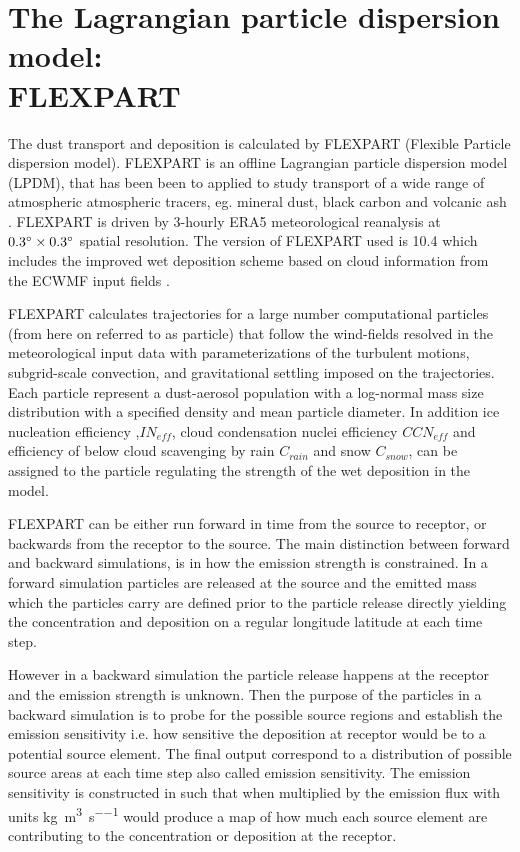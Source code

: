 \section{The Lagrangian particle dispersion model: \protect\\ FLEXPART}

\par The dust transport and deposition is calculated by FLEXPART (Flexible Particle dispersion model). FLEXPART is an offline Lagrangian particle dispersion model (LPDM), that has been been to applied to study transport of a wide range of atmospheric atmospheric tracers, eg. mineral dust, black carbon and volcanic ash \parencite{flexdust_ref_2016,choi_investigation_2020, eckhardt2008estimation}. FLEXPART is driven by 3-hourly ERA5 meteorological reanalysis at $0.3\degree \times 0.3\degree$ spatial resolution. The version of FLEXPART used is 10.4 which includes the improved wet deposition scheme based on cloud information from the ECWMF input fields \parencite{flexpart_wetdep}. 
\par FLEXPART calculates trajectories for a large number computational particles (from here on referred to as particle) that follow the wind-fields resolved in the meteorological input data with parameterizations of the turbulent motions, subgrid-scale convection, and gravitational settling imposed on the trajectories. Each particle represent a dust-aerosol population with a log-normal mass size distribution with a specified density and mean particle diameter. In addition ice nucleation efficiency ,$IN_{eff}$, cloud condensation nuclei efficiency $CCN_{eff}$ and efficiency of below cloud scavenging by rain $C_{rain}$ and snow $C_{snow}$, can be assigned to the particle regulating the strength of the wet deposition in the model.   

FLEXPART can be either run forward in time from the source to receptor, or backwards from the receptor to the source. The main distinction between forward and backward simulations, is in how the emission strength is constrained. In a forward simulation particles are released at the source and the emitted mass which the particles carry are defined prior to the particle release directly yielding the concentration and deposition on a regular longitude latitude at each time step. 

However in a backward simulation the particle release happens at the receptor and the emission strength is unknown. Then the purpose of the particles in a backward simulation is to probe for the possible source regions and establish the emission sensitivity i.e. how sensitive the deposition at receptor would be to a potential source element. The final output correspond to a distribution of possible source areas at each time step also called emission sensitivity. The emission sensitivity is constructed in such that when multiplied by the emission flux with units \si{\kg\per\cubic\metre\per\s} would produce a map of how much each source element are contributing to the concentration or deposition at the receptor.  

